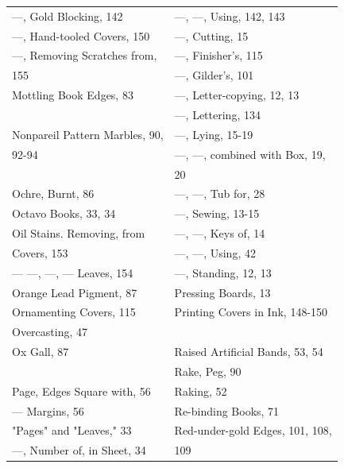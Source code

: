 \documentclass[twoside]{book}
\begin{document}
\begin{center}
\begin{tiny}
\begin{tabular}{l|l}
---, Gold Blocking, 142             & ---, ---, Using, 142, 143         \\
---, Hand-tooled Covers, 150        & ---, Cutting, 15                  \\
---, Removing Scratches from,       & ---, Finisher's, 115              \\
    155                             & ---, Gilder's, 101                \\
Mottling Book Edges, 83             & ---, Letter-copying, 12, 13       \\
                                    & ---, Lettering, 134               \\
Nonpareil Pattern Marbles, 90,      & ---, Lying, 15-19                 \\
92-94                               & ---, ---, combined with Box, 19,  \\
                                    &     20                            \\
Ochre, Burnt, 86                    & ---, ---, Tub for, 28             \\
Octavo Books, 33, 34                & ---, Sewing, 13-15                \\
Oil Stains. Removing, from          & ---, ---, Keys of, 14             \\
    Covers, 153                     & ---, ---, Using, 42               \\
--- ---, ---, --- Leaves, 154       & ---, Standing, 12, 13             \\
Orange Lead Pigment, 87             & Pressing Boards, 13               \\
Ornamenting Covers, 115             & Printing Covers in Ink, 148-150   \\
Overcasting, 47                     &                                   \\
Ox Gall, 87                         & Raised Artificial Bands, 53, 54   \\
                                    & Rake, Peg, 90                     \\
Page, Edges Square with, 56         & Raking, 52                        \\
--- Margins, 56                     & Re-binding Books, 71              \\
"Pages" and "Leaves," 33            & Red-under-gold Edges, 101, 108,   \\
---, Number of, in Sheet, 34        &     109                           \\

\end{tabular}
\end{tiny}
\end{center}
\end{document}
